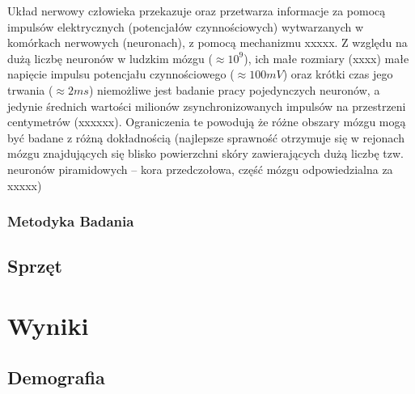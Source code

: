 \documentclass{./assets/wfis}
\begin{document}
Układ nerwowy człowieka przekazuje oraz przetwarza informacje za pomocą impulsów elektrycznych (potencjałów czynnościowych) wytwarzanych w komórkach nerwowych (neuronach), z pomocą mechanizmu xxxxx. Z względu na dużą liczbę neuronów w ludzkim mózgu ($\approx10^9$), ich małe rozmiary (xxxx) małe napięcie impulsu potencjału czynnościowego ($\approx100mV$) oraz krótki czas jego trwania ($\approx2ms$) niemożliwe jest badanie pracy pojedynczych neuronów, a jedynie średnich wartości milionów zsynchronizowanych impulsów na przestrzeni centymetrów (xxxxxx). Ograniczenia te powodują że różne obszary mózgu mogą być badane z różną dokładnością (najlepsze sprawność otrzymuje się w rejonach mózgu znajdujących się blisko powierzchni skóry zawierających dużą liczbę tzw. neuronów piramidowych – kora przedczołowa, część mózgu odpowiedzialna za xxxxx)

\subsection{Metodyka Badania}

\section{Sprzęt}

\chapter{Wyniki}
\section{Demografia}

\printbibliography
\end{document}
